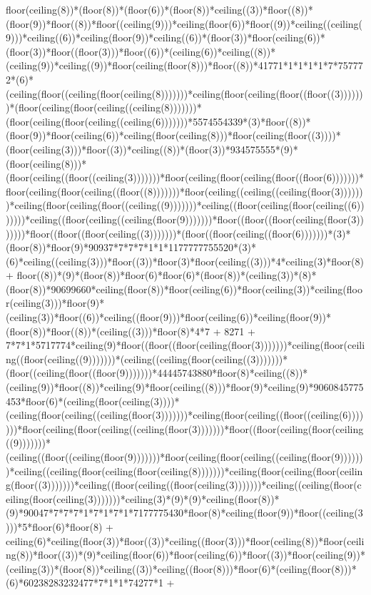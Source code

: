 floor(ceiling(8))*(floor(8))*(floor(6))*(floor(8))*ceiling((3))*floor((8))*(floor(9))*floor((8))*floor((ceiling(9)))*ceiling(floor(6))*floor((9))*ceiling((ceiling(9)))*ceiling((6))*ceiling(floor(9))*ceiling((6))*(floor(3))*floor(ceiling(6))*(floor(3))*floor((floor(3)))*floor((6))*(ceiling(6))*ceiling((8))*(ceiling(9))*ceiling((9))*floor(ceiling(floor(8)))*floor((8))*41771*1*1*1*1*7*757772*(6)*(ceiling(floor((ceiling(floor(ceiling(8)))))))*ceiling(floor(ceiling(floor((floor((3)))))))*(floor(ceiling(floor(ceiling((ceiling(8)))))))*(floor(ceiling(floor(ceiling((ceiling(6)))))))*5574554339*(3)*floor((8))*(floor(9))*floor(ceiling(6))*ceiling(floor(ceiling(8)))*floor(ceiling(floor((3))))*(floor(ceiling(3)))*floor((3))*ceiling((8))*(floor(3))*934575555*(9)*(floor(ceiling(8)))*(floor(ceiling((floor((ceiling(3)))))))*floor(ceiling(floor(ceiling(floor((floor(6)))))))*floor(ceiling(floor(ceiling((floor((8)))))))*floor(ceiling((ceiling((ceiling(floor(3)))))))*ceiling(floor(ceiling(floor((ceiling((9)))))))*ceiling((floor(ceiling(floor(ceiling((6)))))))*ceiling((floor(ceiling((ceiling(floor(9)))))))*floor((floor((floor(ceiling(floor(3)))))))*floor((floor((floor(ceiling((3)))))))*(floor((floor(ceiling((floor(6)))))))*(3)*(floor(8))*floor(9)*90937*7*7*7*1*1*1177777755520*(3)*(6)*ceiling((ceiling(3)))*floor((3))*floor(3)*floor(ceiling((3)))*4*ceiling(3)*floor(8) + floor((8))*(9)*(floor(8))*floor(6)*floor(6)*(floor(8))*(ceiling(3))*(8)*(floor(8))*90699660*ceiling(floor(8))*floor(ceiling(6))*floor(ceiling(3))*ceiling(floor(ceiling(3)))*floor(9)*(ceiling(3))*floor((6))*ceiling((floor(9)))*floor(ceiling(6))*ceiling(floor(9))*(floor(8))*floor((8))*(ceiling((3)))*floor(8)*4*7 + 8271 + 7*7*1*5717774*ceiling(9)*floor((floor((floor(ceiling(floor(3)))))))*ceiling(floor(ceiling((floor(ceiling((9)))))))*(ceiling((ceiling(floor(ceiling((3)))))))*(floor((ceiling(floor((floor(9)))))))*44445743880*floor(8)*ceiling((8))*(ceiling(9))*floor((8))*ceiling(9)*floor(ceiling((8)))*floor(9)*ceiling(9)*9060845775453*floor(6)*(ceiling(floor(ceiling(3))))*(ceiling(floor(ceiling((ceiling(floor(3)))))))*ceiling(floor(ceiling((floor((ceiling(6)))))))*floor(ceiling(floor(ceiling((ceiling(floor(3)))))))*floor((floor(ceiling(floor(ceiling((9)))))))*(ceiling((floor((ceiling(floor(9)))))))*floor(ceiling(floor(ceiling((ceiling(floor(9)))))))*ceiling((ceiling(floor(ceiling(floor(ceiling(8)))))))*ceiling(floor(ceiling(floor(ceiling(floor((3)))))))*ceiling((floor(ceiling((floor(ceiling(3)))))))*ceiling((ceiling(floor(ceiling(floor(ceiling(3)))))))*ceiling(3)*(9)*(9)*ceiling(floor(8))*(9)*90047*7*7*7*1*7*1*7*1*7177775430*floor(8)*ceiling(floor(9))*floor((ceiling(3)))*5*floor(6)*floor(8) + ceiling(6)*ceiling(floor(3))*floor((3))*ceiling((floor(3)))*floor(ceiling(8))*floor(ceiling(8))*floor((3))*(9)*ceiling(floor(6))*floor(ceiling(6))*floor((3))*floor(ceiling(9))*(ceiling(3))*(floor(8))*ceiling((3))*ceiling((floor(8)))*floor(6)*(ceiling(floor(8)))*(6)*60238283232477*7*1*1*74277*1 + 